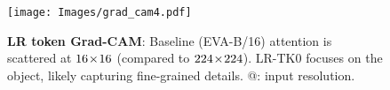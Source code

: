 \begin{figure}[!t]
\centering
{}
\hfill
\subfloat
{
\texttt{[image: Images/grad\_cam4.pdf]}
}
\caption{ 
\textbf{LR token Grad-CAM}: Baseline (EVA-B/16) attention is scattered at $16\!\times\!16$ (compared to $224\!\times\!224$).  LR-TK0 focuses on the object, likely capturing fine-grained details. @: input resolution. 
}
\label{fig:gram_cam_results}
 \vspace{-8pt}
\end{figure}
